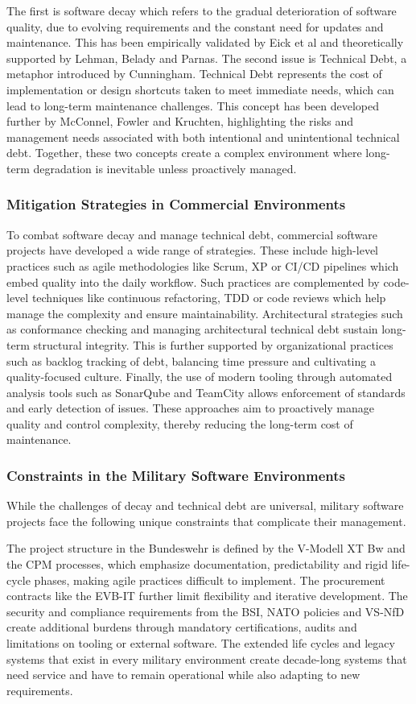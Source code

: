 The first is software decay which refers to the gradual deterioration of software quality, due to evolving requirements and the constant need for updates and maintenance. This has been empirically validated by Eick et al and theoretically supported by Lehman, Belady and Parnas.
The second issue is Technical Debt, a metaphor introduced by Cunningham. Technical Debt represents the cost of implementation or design shortcuts taken to meet immediate needs, which can lead to long-term maintenance challenges. This concept has been developed further by McConnel, Fowler and Kruchten, highlighting the risks and management needs
associated with both intentional and unintentional technical debt. Together, these two concepts create a complex environment where long-term degradation is inevitable unless proactively managed.

\subsubsection{Mitigation Strategies in Commercial Environments}
To combat software decay and manage technical debt, commercial software projects have developed a wide range of strategies. These include high-level practices such as agile methodologies like Scrum, \ac{XP} or CI/CD pipelines which embed quality into the daily workflow.
Such practices are complemented by code-level techniques like continuous refactoring, \ac{TDD} or code reviews which help manage the complexity and ensure maintainability. Architectural strategies such as conformance checking and managing architectural technical debt sustain long-term structural integrity.
This is further supported by organizational practices such as backlog tracking of debt, balancing time pressure and cultivating a quality-focused culture. Finally, the use of modern tooling through automated analysis tools such as SonarQube and TeamCity allows enforcement of standards and early detection of issues.
These approaches aim to proactively manage quality and control complexity, thereby reducing the long-term cost of maintenance. 

\subsubsection{Constraints in the Military Software Environments}
While the challenges of decay and technical debt are universal, military software projects face the following unique constraints that complicate their management.

The project structure in the Bundeswehr is defined by the V-Modell XT Bw and the \ac{CPM} processes, which emphasize documentation, predictability and rigid life-cycle phases, making agile practices difficult to implement.
The procurement contracts like the \ac{EVB-IT} further limit flexibility and iterative development. The security and compliance requirements from the BSI, NATO policies and VS-NfD create additional burdens through mandatory certifications, audits and limitations on tooling or external software.
The extended life cycles and legacy systems that exist in every military environment create decade-long systems that need service and have to remain operational while also adapting to new requirements.

